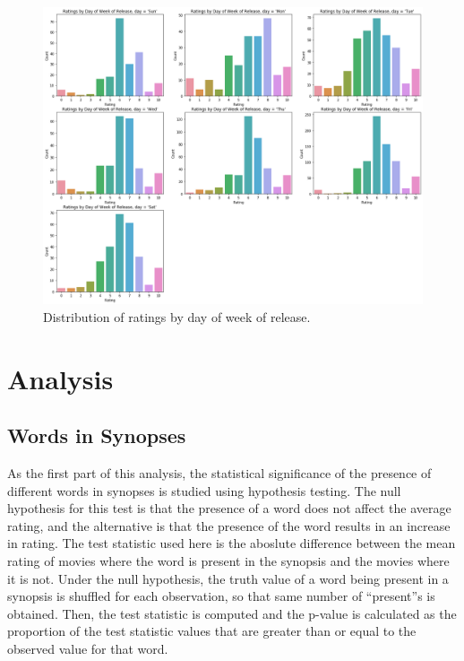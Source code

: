 \documentclass[12pt, oneside]{article}   	%
\begin{document}
\begin{itemize}
\begin{figure}
\includegraphics[width=\textwidth]{ratings_dow}
\caption{\label{fig:ratings_dow}Distribution of ratings by day of week of release.}
\end{figure}

\end{itemize}

\section{Analysis}

\subsection{Words in Synopses}

As the first part of this analysis, the statistical significance of the presence of different words in synopses is studied using hypothesis testing. The null hypothesis for this test is that the presence of a word does not affect the average rating, and the alternative is that the presence of the word results in an increase in rating. The test statistic used here is the aboslute difference between the mean rating of movies where the word is present in the synopsis and the movies where it is not. Under the null hypothesis, the truth value of a word being present in a synopsis is shuffled for each observation, so that same number of ``present''s is obtained. Then, the test statistic is computed and the p-value is calculated as the proportion of the test statistic values that are greater than or equal to the observed value for that word.
\end{document}
